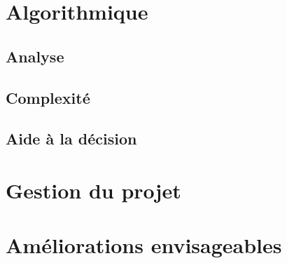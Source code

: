 \documentclass[a4paper,11pt]{article}
\begin{document}
\section{Algorithmique}
  \subsection{Analyse} \label{04-analyse} 
  \subsection{Complexité} 
  \subsection{Aide à la décision} 
\section{Gestion du projet}
  
\section{Améliorations envisageables}
  

\end{document}
